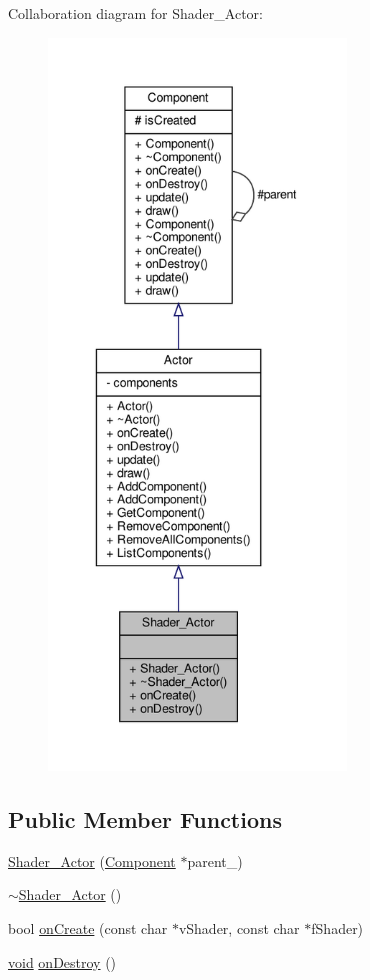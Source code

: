 Collaboration diagram for Shader\+\_\+\+Actor\+:
\nopagebreak
\begin{figure}[H]
\begin{center}
\leavevmode
\includegraphics[height=550pt]{classShader__Actor__coll__graph}
\end{center}
\end{figure}
\subsection*{Public Member Functions}
\begin{DoxyCompactItemize}
\item 
\hyperlink{classShader__Actor_a190300c78fd292ec71562cc664b2bef9}{Shader\+\_\+\+Actor} (\hyperlink{classComponent}{Component} $\ast$parent\+\_\+)
\item 
\hyperlink{classShader__Actor_aed626ab7f48cab9a038e5bfdebc28a98}{$\sim$\+Shader\+\_\+\+Actor} ()
\item 
bool \hyperlink{classShader__Actor_a9110b64f8860a453ca7201be137c16c2}{on\+Create} (const char $\ast$v\+Shader, const char $\ast$f\+Shader)
\item 
\hyperlink{imgui__impl__opengl3__loader_8h_ac668e7cffd9e2e9cfee428b9b2f34fa7}{void} \hyperlink{classShader__Actor_a16f7f5f30d3f3cd125de9713457a7db2}{on\+Destroy} ()
\end{DoxyCompactItemize}
